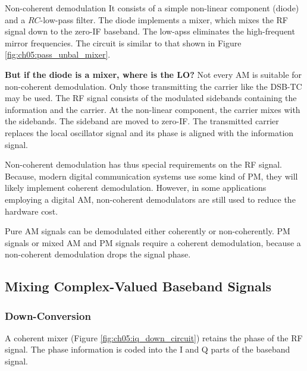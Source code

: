 \begin{refsection}
\begin{excursus}{Non-coherent demodulation}
	It consists of a simple non-linear component (diode) and a $RC$-low-pass filter. The diode implements a mixer, which mixes the \ac{RF} signal down to the zero-\acs{IF} baseband. The low-apss eliminates the high-frequent mirror frequencies. The circuit is similar to that shown in Figure \ref{fig:ch05:pass_unbal_mixer}.
	
	\vspace{0.5em}
	
	\textbf{But if the diode is a mixer, where is the \ac{LO}?} Not every \ac{AM} is suitable for non-coherent demodulation. Only those transmitting the carrier like the \ac{DSB-TC} may be used. The \ac{RF} signal consists of the modulated sidebands containing the information and the carrier. At the non-linear component, the carrier mixes with the sidebands. The sideband are moved to zero-\ac{IF}. The transmitted carrier replaces the local oscillator signal and its phase is aligned with the information signal.
	
	\vspace{0.5em}
	
	Non-coherent demodulation has thus special requirements on the \ac{RF} signal. Because, modern digital communication systems use some kind of \ac{PM}, they will likely implement coherent demodulation. However, in some applications employing a digital \ac{AM}, non-coherent demodulators are still used to reduce the hardware cost.
\end{excursus}

\begin{fact}
	Pure \ac{AM} signals can be demodulated either coherently or non-coherently. \ac{PM} signals or mixed \ac{AM} and \ac{PM} signals require a coherent demodulation, because a non-coherent demodulation drops the signal phase.
\end{fact}

\subsection{Mixing Complex-Valued Baseband Signals}

\subsubsection{Down-Conversion}

A coherent mixer (Figure \ref{fig:ch05:iq_down_circuit}) retains the phase of the \ac{RF} signal. The phase information is coded into the \ac{I} and \ac{Q} parts of the baseband signal.


\end{refsection}
